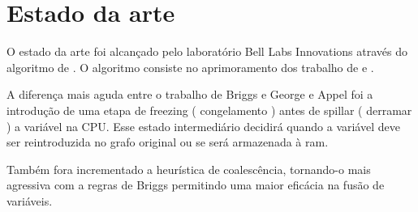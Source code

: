 \section{Estado da arte}

O estado da arte foi alcançado pelo laboratório Bell Labs Innovations através do algoritmo de  \textcite{irc}.
O algoritmo consiste no aprimoramento dos trabalho de \textcite{briggs} e \textcite{chaitin}.

A diferença mais aguda entre o trabalho de Briggs e George e Appel foi a introdução de uma etapa de freezing ( congelamento ) antes de spillar ( derramar ) a variável na CPU. Esse estado intermediário decidirá quando a variável deve ser reintroduzida no grafo original ou se será armazenada à ram.

Também fora incrementado a heurística de coalescência, tornando-o mais agressiva com a regras de Briggs permitindo uma maior eficácia na fusão de variáveis. 


